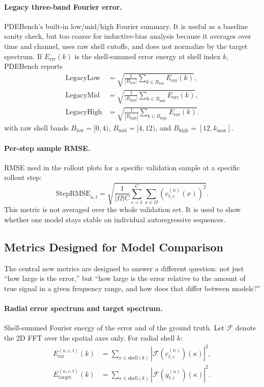 \documentclass[11pt]{article}
\begin{document}
\paragraph{Legacy three-band Fourier error.}
PDEBench's built-in low/mid/high Fourier summary. It is useful as a baseline sanity check, but too coarse for inductive-bias analysis because it averages over time and channel, uses raw shell cutoffs, and does not normalize by the target spectrum. If $E_{\mathrm{err}}(k)$ is the shell-summed error energy at shell index $k$, PDEBench reports
\begin{align}
\mathrm{LegacyLow} &=
\sqrt{\frac{1}{|B_{\mathrm{low}}|}\sum_{k \in B_{\mathrm{low}}} E_{\mathrm{err}}(k)}, \\
\mathrm{LegacyMid} &=
\sqrt{\frac{1}{|B_{\mathrm{mid}}|}\sum_{k \in B_{\mathrm{mid}}} E_{\mathrm{err}}(k)}, \\
\mathrm{LegacyHigh} &=
\sqrt{\frac{1}{|B_{\mathrm{high}}|}\sum_{k \in B_{\mathrm{high}}} E_{\mathrm{err}}(k)}.
\end{align}
with raw shell bands $B_{\mathrm{low}}=[0,4)$, $B_{\mathrm{mid}}=[4,12)$, and $B_{\mathrm{high}}=[12,k_{\max}]$.

\paragraph{Per-step sample RMSE.}
RMSE used in the rollout plots for a specific validation sample at a specific rollout step:
\[
\mathrm{StepRMSE}_{n,t}
=
\sqrt{
\frac{1}{|\Omega|C}
\sum_{c=1}^{C}\sum_{x \in \Omega}
\left(e^{(n)}_{t,c}(x)\right)^2
}.
\]
This metric is not averaged over the whole validation set. It is used to show whether one model stays stable on individual autoregressive sequences.

\subsection{Metrics Designed for Model Comparison}
The central new metrics are designed to answer a different question: not just ``how large is the error,'' but ``how large is the error relative to the amount of true signal in a given frequency range, and how does that differ between models?''

\paragraph{Radial error spectrum and target spectrum.}
Shell-summed Fourier energy of the error and of the ground truth. Let $\mathcal{F}$ denote the 2D FFT over the spatial axes only. For radial shell $k$:
\begin{align}
E^{(n,c,t)}_{\mathrm{err}}(k)
&=
\sum_{\kappa \in \mathrm{shell}(k)}
\left|
\mathcal{F}(e^{(n)}_{t,c})(\kappa)
\right|^2, \\
E^{(n,c,t)}_{\mathrm{target}}(k)
&=
\sum_{\kappa \in \mathrm{shell}(k)}
\left|
\mathcal{F}(y^{(n)}_{t,c})(\kappa)
\right|^2.
\end{align}
\end{document}
